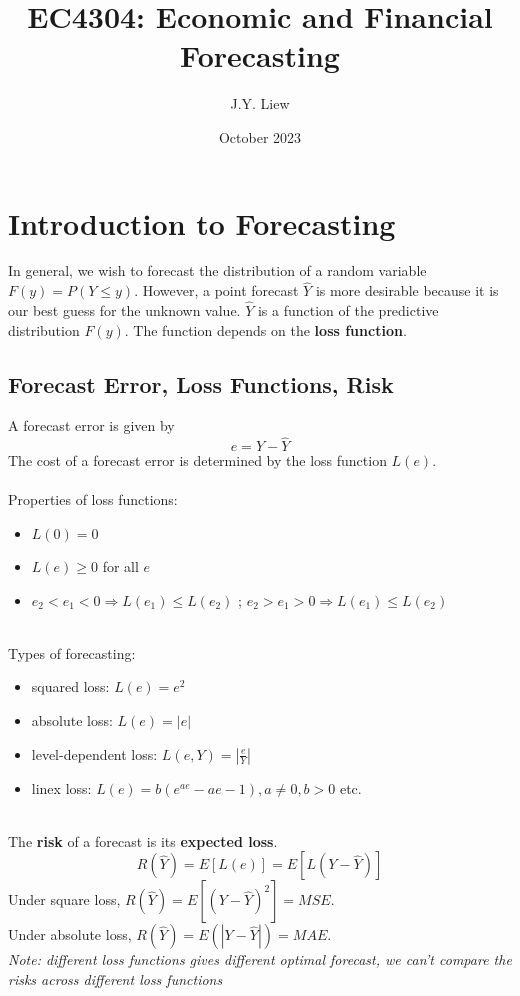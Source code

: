 \documentclass{article}
\title{EC4304: Economic and Financial Forecasting}
\author{J.Y. Liew}
\date{October 2023}
\begin{document}
\maketitle

\tableofcontents

\pagebreak

\section{Introduction to Forecasting}
In general, we wish to forecast the distribution of a random variable $F(y) = P(Y \leq y)$. However, a point forecast $\hat{Y}$ is more desirable because it  is our best guess for the unknown value. $\hat{Y}$ is a function of the predictive distribution $F(y)$. The function depends on the \textbf{loss function}.

\subsection{Forecast Error, Loss Functions, Risk}
A forecast error is given by 
$$e = Y-\hat{Y}$$
The cost of a forecast error is determined by the loss function $L(e)$.\\
\\
Properties of loss functions:
\begin{itemize}
    \item $L(0) = 0$
    \item $L(e) \geq 0$ for all $e$
    \item $e_2 < e_1 < 0 \Rightarrow L(e_1) \leq L(e_2)$ ; $e_2 > e_1 > 0 \Rightarrow L(e_1) \leq L(e_2)$
\end{itemize}
\\
Types of forecasting:
\begin{itemize}
    \item squared loss: $L(e) = e^2$
    \item absolute loss: $L(e) = |e|$
    \item level-dependent loss: $L(e, Y) = |\frac{e}{Y}|$
    \item linex loss: $L(e) = b(e^{ae}-ae-1), a \neq 0, b > 0$ etc.
\end{itemize}
\\
The \textbf{risk} of a forecast is its \textbf{expected loss}.
$$R(\hat{Y}) = E[L(e)] = E[L(Y-\hat{Y})]$$
Under square loss, $R(\hat{Y}) = E[(Y - \hat{Y})^2] = MSE$.\\
Under absolute loss, $R(\hat{Y}) = E(|Y - \hat{Y}|) = MAE$.\\
{\center \small{\textit{Note: different loss functions gives different optimal forecast, we can't compare the risks across different loss functions}}}
\end{document}
